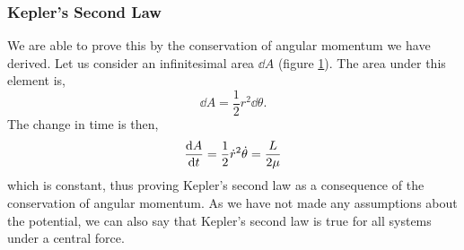 \documentclass{book}
\begin{document}
\subsubsection{Kepler's Second Law}
\begin{figure}[h]
    \centering
    \caption{}
    \label{fig:tri}
\end{figure}
We are able to prove this by the conservation of angular momentum we have derived. Let us consider an infinitesimal area $\dd{A}$ (figure \ref{fig:tri}). The area under this element is,
\begin{equation}
    \dd{A} = \frac{1}{2}r^2\dd{\theta}.
\end{equation}
The change in time is then,
\begin{equation}\label{K2}
    \dv{A}{t} = \frac{1}{2}\Dot{r}^2 \Dot{\theta} = \frac{L}{2\mu}
\end{equation}
which is constant, thus proving Kepler's second law as a consequence of the conservation of angular momentum. As we have not made any assumptions about the potential, we can also say that Kepler's second law is true for all systems under a central force.
\end{document}
